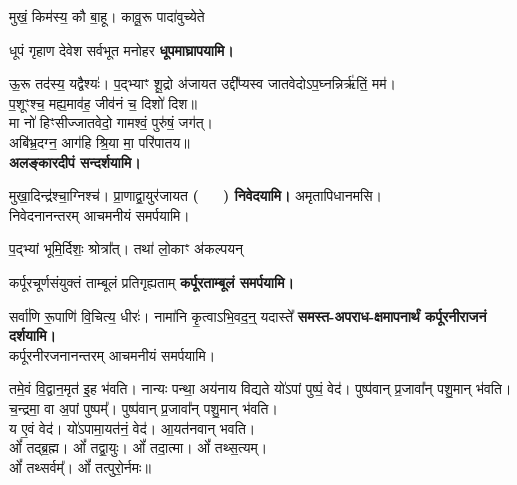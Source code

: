  
\begin{center}

{मुखं॒ किम॑स्य॒ कौ बा॒हू। कावू॒रू पादा॑वुच्येते}

{धूपं गृहाण देवेश सर्वभूत मनोहर}
\textbf{\devAya{} धूपमाघ्रापयामि।}
\medskip

{ऊ॒रू तद॑स्य॒ यद्वैश्यः॑। प॒द्भ्याꣳ शू॒द्रो अ॑जायत}
उद्दी᳚प्यस्व जातवेदोऽप॒घ्नन्निर्ऋ॑तिं॒ मम॑।\\
प॒शूꣳश्च॒ मह्य॒माव॑ह॒ जीव॑नं च॒ दिशो॑ दिश॥ \\
मा नो॑ हिꣳसीज्जातवेदो॒ गामश्वं॒ पुरु॑षं॒ जग॑त्।\\
अबि॑भ्र॒दग्न॒ आग॑हि श्रि॒या मा॒ परि॑पातय॥ \\
\textbf{\devAya{} अलङ्कारदीपं सन्दर्शयामि।}
\medskip

{मुखा॒दिन्द्र॑श्चा॒ग्निश्च॑। प्रा॒णाद्वा॒युर॑जायत}
\textbf{\devAya{} \mbox{(~~~)} निवेदयामि।} अमृतापिधानमसि।\\
निवेदनानन्तरम् आचमनीयं समर्पयामि।\medskip


{प॒द्भ्यां भूमि॒र्दिशः॒ श्रोत्रा᳚त्। तथा॑ लो॒काꣳ अ॑कल्पयन्}

{कर्पूरचूर्णसंयुक्तं ताम्बूलं प्रतिगृह्यताम्}
\textbf{\devAya{} कर्पूरताम्बूलं समर्पयामि।}
\medskip

{सर्वा॑णि रू॒पाणि॑ वि॒चित्य॒ धीरः॑। नामा॑नि कृ॒त्वाऽभि॒वद॒न्॒ यदास्ते᳚}
\textbf{\devAya{} समस्त-अपराध-क्षमापनार्थं कर्पूरनीराजनं दर्शयामि।}\\
कर्पूरनीरजनानन्तरम् आचमनीयं समर्पयामि।
\medskip

{तमे॒वं वि॒द्वान॒मृत॑ इ॒ह भ॑वति। नान्यः पन्था॒ अय॑नाय विद्यते}
यो॑ऽपां पुष्पं॒ वेद॑। पुष्प॑वान् प्र॒जावा᳚न् पशु॒मान् भ॑वति।\\
च॒न्द्रमा॒ वा अ॒पां पुष्पम्᳚। पुष्प॑वान् प्र॒जावा᳚न् पशु॒मान् भ॑वति।\\
य ए॒वं वेद॑। यो॑ऽपामा॒यत॑नं॒ वेद॑। आ॒यत॑नवान् भवति।\\

ओं᳚ तद्ब्र॒ह्म। ओं᳚ तद्वा॒युः। ओं᳚ तदा॒त्मा। ओं᳚ तथ्स॒त्यम्‌।\\
ओं᳚ तथ्सर्वम्᳚‌। ओं᳚ तत्पुरो॒र्नमः॥\\


\end{center}
